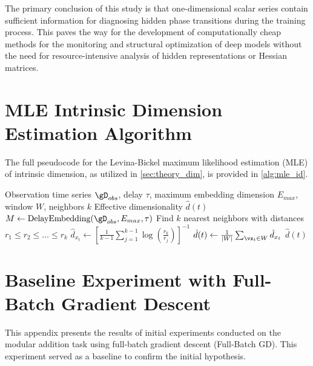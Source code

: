 \documentclass{article}
\begin{document}
The primary conclusion of this study is that one-dimensional scalar series contain sufficient information for diagnosing hidden phase transitions during the training process. This paves the way for the development of computationally cheap methods for the monitoring and structural optimization of deep models without the need for resource-intensive analysis of hidden representations or Hessian matrices.






\appendix
\section{MLE Intrinsic Dimension Estimation Algorithm}\label{app:alg}

The full pseudocode for the Levina-Bickel maximum likelihood estimation (MLE) of intrinsic dimension, as utilized in \cref{sec:theory_dim}, is provided in \cref{alg:mle_id}.

\begin{algorithm}[htbp]
\caption{MLE Intrinsic Dimension Estimation (Levina-Bickel)}\label{alg:mle_id}
\begin{algorithmic}[1]
\Input Observation time series $\gD_{obs}$, delay $\tau$, maximum embedding dimension $E_{max}$, window $W$, neighbors $k$
\Output Effective dimensionality $\hat{d}(t)$
\State $M \gets \text{DelayEmbedding}(\gD_{obs}, E_{max}, \tau)$ 
    \State Find $k$ nearest neighbors with distances $r_1 \le r_2 \le \dots \le r_k$
    \State $\hat{d}_{x_t} \gets \left[ \frac{1}{k-1} \sum_{j=1}^{k-1} \log \left( \frac{r_k}{r_j} \right) \right]^{-1}$ 
\EndFor
\State $\hat{d}(t) \gets \frac{1}{|W|} \sum_{\vx_t \in W} \hat{d}_{x_t}$ 
\State \Return $\hat{d}(t)$
\end{algorithmic}
\end{algorithm}
\section{Baseline Experiment with Full-Batch Gradient Descent}\label{app:exp}

This appendix presents the results of initial experiments conducted on the modular addition task using full-batch gradient descent (Full-Batch GD). This experiment served as a baseline to confirm the initial hypothesis.
\end{document}
